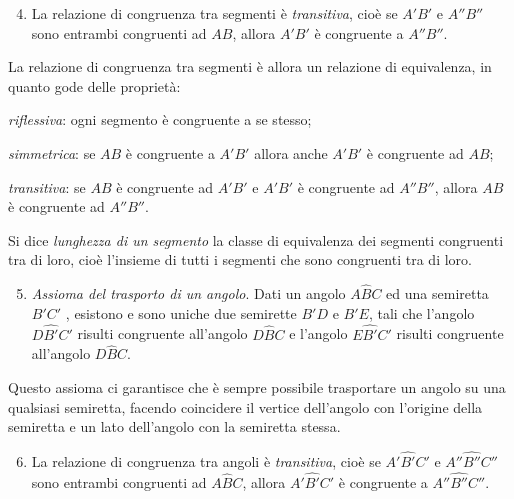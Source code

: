 \begin{enumerate}[label=\Roman{*}.]
\setcounter{enumi}{3}
\item La relazione di congruenza tra segmenti è \emph{transitiva}, 
cioè se $A'B'$ e $A''B''$ sono entrambi congruenti ad $AB$, allora 
$A'B'$ è congruente a $A''B''$.
\end{enumerate}
La relazione di congruenza tra segmenti è allora un relazione di 
equivalenza, in quanto gode delle proprietà:
\begin{enumeratea}
\item \emph{riflessiva}: ogni segmento è congruente a se stesso;
\item \emph{simmetrica}: se $AB$ è congruente a $A'B'$ allora anche 
$A'B'$ è congruente ad $AB$;
\item \emph{transitiva}: se $AB$ è congruente ad $A'B'$ e $A'B'$ è 
congruente ad $A''B''$, allora $AB$ è congruente ad $A''B''$.
\end{enumeratea}

\begin{definizione}
Si dice \emph{lunghezza di un segmento} la classe di equivalenza dei 
segmenti congruenti tra di loro, cioè l'insieme di tutti i segmenti 
che sono congruenti tra di loro.
\end{definizione}

\begin{enumerate}[label=\Roman{*}.]
\setcounter{enumi}{4}
\item \emph{Assioma del trasporto di un angolo}. Dati un angolo 
$A\widehat{B}C$ ed una semiretta $B'C'$ , esistono e sono uniche due 
semirette $B'D$ e $B'E$, tali che l'angolo $D\widehat{B'}C'$ risulti 
congruente all'angolo $D\widehat{B}C$ e l'angolo $E\widehat{B'}C'$ 
risulti congruente all'angolo $D\widehat{B}C$.
\end{enumerate}
Questo assioma ci garantisce che è sempre possibile trasportare un 
angolo su una qualsiasi semiretta, facendo coincidere il vertice 
dell'angolo con l'origine della semiretta e un lato dell'angolo con 
la semiretta stessa.

\begin{enumerate}[label=\Roman{*}.]
\setcounter{enumi}{5}
\item La relazione di congruenza tra angoli è \emph{transitiva}, cioè 
se $A'\widehat{B'}C'$ e $A''\widehat{B''}C''$ sono entrambi 
congruenti ad $A\widehat{B}C$, allora $A'\widehat{B'}C'$ è congruente 
a $A''\widehat{B''}C''$.
\end{enumerate}

